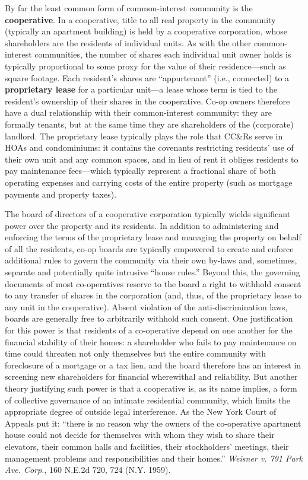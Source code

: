 By far the least common form of common-interest community is the
\textbf{cooperative}. In a cooperative, title to all real property in the
community (typically an apartment building) is held by a cooperative
corporation, whose shareholders are the residents of individual units. As with
the other common-interest communities, the number of shares each individual unit
owner holds is typically proportional to some proxy for the value of their
residence---such as square footage. Each resident's shares are ``appurtenant''
(i.e., connected) to a \textbf{proprietary lease} for a particular unit---a
lease whose term is tied to the resident's ownership of their shares in the
cooperative. Co-op owners therefore have a dual relationship with their
common-interest community: they are formally tenants, but at the same time they
are shareholders of the (corporate) landlord. The proprietary lease typically
plays the role that CC\&Rs serve in HOAs and condominiums: it contains the
covenants restricting residents' use of their own unit and any common spaces,
and in lieu of rent it obliges residents to pay maintenance fees---which
typically represent a fractional share of both operating expenses and carrying
costs of the entire property (such as mortgage payments and property taxes).

The board of directors of a cooperative corporation typically wields significant
power over the property and its residents. In addition to administering and
enforcing the terms of the proprietary lease and managing the property on behalf
of all the residents, co-op boards are typically empowered to create and enforce
additional rules to govern the community via their own by-laws and, sometimes,
separate and potentially quite intrusive ``house rules.'' Beyond this, the
governing documents of most co-operatives reserve to the board a right to
withhold consent to any transfer of shares in the corporation (and, thus, of the
proprietary lease to any unit in the cooperative). Absent violation of the
anti-discrimination laws, boards are generally free to arbitrarily withhold such
consent. One justification for this power is that residents of a co-operative
depend on one another for the financial stability of their homes: a shareholder
who fails to pay maintenance on time could threaten not only themselves but the
entire community with foreclosure of a mortgage or a tax lien, and the board
therefore has an interest in screening new shareholders for financial
wherewithal and reliability. But another theory justifying such power is that a
cooperative is, as its name implies, a form of collective governance of an
intimate residential community, which limits the appropriate degree of outside
legal interference. As the New York Court of Appeals put it: ``there is no
reason why the owners of the co-operative apartment house could not decide for
themselves with whom they wish to share their elevators, their common halls and
facilities, their stockholders' meetings, their management problems and
responsibilities and their homes.'' \emph{Weisner v. 791 Park Ave. Corp.}, 160
N.E.2d 720, 724 (N.Y. 1959).

